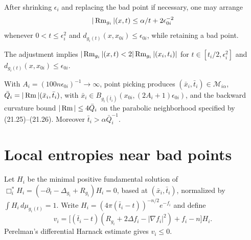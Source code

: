 \begin{lemma}
\label{lem:chow-iii-adjusted-bad-sequence}
After shrinking \(\epsilon_i\) and replacing the bad point if necessary, one
may arrange
\[
|\operatorname{Rm}_{g_i}|(x,t)\le\alpha/t+2\epsilon_{0i}^{-2}
\]
whenever \(0<t\le\epsilon_i^2\) and
\(d_{g_i(t)}(x,x_{0i})\le\epsilon_{0i}\), while retaining a bad point.
\end{lemma}

\begin{remark}
\label{rem:chow-iii-adjusted-local-bound}
The adjustment implies \(|\operatorname{Rm}_{g_i}|(x,t)<2|\operatorname{Rm}_{g_i}|(x_i,t_i)|\) for
\(t\in[t_i/2,\epsilon_i^2]\) and
\(d_{g_i(t)}(x,x_{0i})\le\epsilon_{0i}\).
\end{remark}

\begin{lemma}
\label{lem:chow-iii-well-chosen-points}
With \(A_i=(100n\epsilon_{0i})^{-1}\to\infty\), point picking produces
\((\bar x_i,\bar t_i)\in\mathcal M_{i\alpha}\),
\(\bar Q_i=|\operatorname{Rm}|(\bar x_i,\bar t_i)\), with
\(\bar x_i\in B_{g_i(\bar t_i)}(x_{0i},(2A_i+1)\epsilon_{0i})\), and the
backward curvature bound \(|\operatorname{Rm}|\le4\bar Q_i\) on the parabolic neighborhood
specified by (21.25)--(21.26).  Moreover \(\bar t_i>\alpha\bar Q_i^{-1}\).
\end{lemma}

\section{Local entropies near bad points}

\begin{definition}
\label{def:chow-iii-adjoint-entropy-quantities}
Let \(H_i\) be the minimal positive fundamental solution of
\(\Box_i^*H_i=(-\partial_t-\Delta_{g_i}+R_{g_i})H_i=0\), based at
\((\bar x_i,\bar t_i)\), normalized by \(\int H_i\,d\mu_{g_i(t)}=1\).  Write
\(H_i=(4\pi(\bar t_i-t))^{-n/2}e^{-f_i}\) and define
\[
v_i=\bigl[(\bar t_i-t)(R_{g_i}+2\Delta f_i-|\nabla f_i|^2)+f_i-n\bigr]H_i.
\]
Perelman's differential Harnack estimate gives \(v_i\le0\).
\end{definition}

